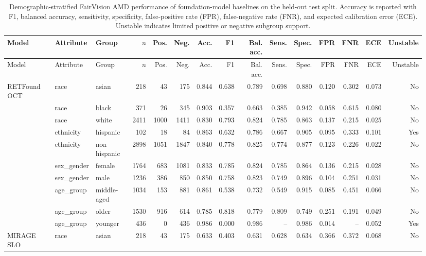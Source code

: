\begingroup
\scriptsize
\setlength{\tabcolsep}{3pt}
\begin{longtable}{@{}lllrrrrrrrrrrrr@{}}
\caption{Demographic-stratified FairVision AMD performance of foundation-model baselines on the held-out test split. Accuracy is reported with F1, balanced accuracy, sensitivity, specificity, false-positive rate (FPR), false-negative rate (FNR), and expected calibration error (ECE). Unstable indicates limited positive or negative subgroup support.}\label{tab:fairvision_foundation_demographic_amd}\\
\toprule
Model & Attribute & Group & $n$ & Pos. & Neg. & Acc. & F1 & Bal. acc. & Sens. & Spec. & FPR & FNR & ECE & Unstable \\
\midrule
\endfirsthead
\toprule
Model & Attribute & Group & $n$ & Pos. & Neg. & Acc. & F1 & Bal. acc. & Sens. & Spec. & FPR & FNR & ECE & Unstable \\
\midrule
\endhead
RETFound OCT & race & asian & 218 & 43 & 175 & 0.844 & 0.638 & 0.789 & 0.698 & 0.880 & 0.120 & 0.302 & 0.073 & No \\
 & race & black & 371 & 26 & 345 & 0.903 & 0.357 & 0.663 & 0.385 & 0.942 & 0.058 & 0.615 & 0.080 & No \\
 & race & white & 2411 & 1000 & 1411 & 0.830 & 0.793 & 0.824 & 0.785 & 0.863 & 0.137 & 0.215 & 0.025 & No \\
 & ethnicity & hispanic & 102 & 18 & 84 & 0.863 & 0.632 & 0.786 & 0.667 & 0.905 & 0.095 & 0.333 & 0.101 & Yes \\
 & ethnicity & non-hispanic & 2898 & 1051 & 1847 & 0.840 & 0.778 & 0.825 & 0.774 & 0.877 & 0.123 & 0.226 & 0.022 & No \\
 & sex\_gender & female & 1764 & 683 & 1081 & 0.833 & 0.785 & 0.824 & 0.785 & 0.864 & 0.136 & 0.215 & 0.028 & No \\
 & sex\_gender & male & 1236 & 386 & 850 & 0.850 & 0.758 & 0.823 & 0.749 & 0.896 & 0.104 & 0.251 & 0.031 & No \\
 & age\_group & middle-aged & 1034 & 153 & 881 & 0.861 & 0.538 & 0.732 & 0.549 & 0.915 & 0.085 & 0.451 & 0.066 & No \\
 & age\_group & older & 1530 & 916 & 614 & 0.785 & 0.818 & 0.779 & 0.809 & 0.749 & 0.251 & 0.191 & 0.049 & No \\
 & age\_group & younger & 436 & 0 & 436 & 0.986 & 0.000 & 0.986 & -- & 0.986 & 0.014 & -- & 0.052 & Yes \\
MIRAGE SLO & race & asian & 218 & 43 & 175 & 0.633 & 0.403 & 0.631 & 0.628 & 0.634 & 0.366 & 0.372 & 0.068 & No \\

\end{longtable}
